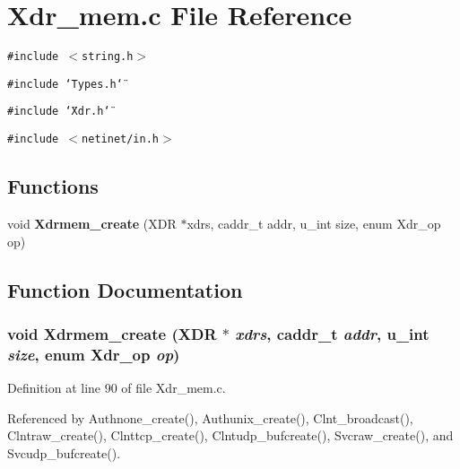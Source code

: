 \section{Xdr\_\-mem.c File Reference}
\label{Xdr__mem_8c}
{\tt \#include $<$string.h$>$}\par
{\tt \#include \char`\"{}Types.h\char`\"{}}\par
{\tt \#include \char`\"{}Xdr.h\char`\"{}}\par
{\tt \#include $<$netinet/in.h$>$}\par
\subsection*{Functions}
\begin{CompactItemize}
\item 
void {\bf Xdrmem\_\-create} (XDR $\ast$xdrs, caddr\_\-t addr, u\_\-int size, enum Xdr\_\-op op)
\end{CompactItemize}


\subsection{Function Documentation}
\subsubsection{\setlength{\rightskip}{0pt plus 5cm}void Xdrmem\_\-create (XDR $\ast$ {\em xdrs}, caddr\_\-t {\em addr}, u\_\-int {\em size}, enum Xdr\_\-op {\em op})}\label{Xdr__mem_8c_a13}




Definition at line 90 of file Xdr\_\-mem.c.

Referenced by Authnone\_\-create(), Authunix\_\-create(), Clnt\_\-broadcast(), Clntraw\_\-create(), Clnttcp\_\-create(), Clntudp\_\-bufcreate(), Svcraw\_\-create(), and Svcudp\_\-bufcreate().